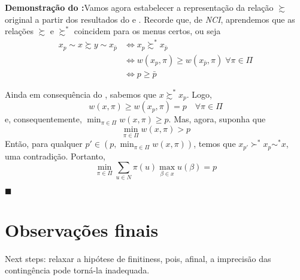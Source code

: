\documentclass[11pt, a4paper]{article}
\theoremstyle{nonumberplain}
\theoremstyle{plain}
\theoremstyle{plain}
\theoremstyle{plain}
\begin{document}
\noindent
\textbf{Demonstração do :}Vamos agora estabelecer a representação da relação $\succsim$ original a partir dos resultados do  e . Recorde que, de \emph{NCI}, aprendemos que as relações $\succsim$ e $\succsim^*$ coincidem para os menus certos, ou seja
\begin{align*}
x_p\sim x\succsim y\sim x_{\bar{p}}&\Leftrightarrow x_p\succsim^* x_{\bar{p}}\\
&\Leftrightarrow w(x_p,\pi)\geq w(x_{\bar{p}},\pi)\; \forall\pi\in\Pi \\
&\Leftrightarrow p\geq \bar{p}
\end{align*}

Ainda em consequência do , sabemos que $x\succsim^* x_p$. Logo, $$w(x,\pi)\geq w(x_p,\pi)=p\quad\forall\pi \in \Pi$$ e, consequentemente, $\min_{\pi\in\Pi}w(x,\pi)\geq p$. Mas, agora, suponha que $$\min_{\pi\in\Pi}w(x,\pi)> p$$ Então, para qualquer $p'\in (p,\min_{\pi\in\Pi}w(x,\pi))$, temos que $x_{p'}\succ^* x_p\sim^* x$, uma contradição. Portanto, $$\min_{\pi\in\Pi}\sum_{u\in N} \pi(u)\max_{\beta\in x}u(\beta)=p$$   
\begin{flushright}
$\blacksquare$
\end{flushright}

\section{Observações finais}
Next steps: relaxar a hipótese de finitiness, pois, afinal, a imprecisão das contingência pode torná-la inadequada. 


\end{document}
